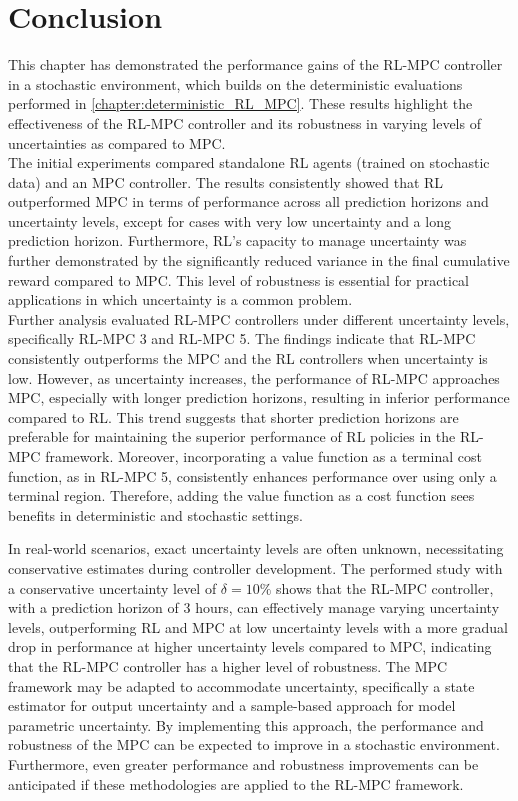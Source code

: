 \section{Conclusion}
This chapter has demonstrated the performance gains of the RL-MPC controller in a stochastic environment, which builds on the deterministic evaluations performed in \autoref{chapter:deterministic_RL_MPC}. These results highlight the effectiveness of the RL-MPC controller and its robustness in varying levels of uncertainties as compared to MPC. \\
The initial experiments compared standalone RL agents (trained on stochastic data) and an MPC controller. The results consistently showed that RL outperformed MPC in terms of performance across all prediction horizons and uncertainty levels, except for cases with very low uncertainty and a long prediction horizon. Furthermore, RL’s capacity to manage uncertainty was further demonstrated by the significantly reduced variance in the final cumulative reward compared to MPC. This level of robustness is essential for practical applications in which uncertainty is a common problem.\\
Further analysis evaluated RL-MPC controllers under different uncertainty levels, specifically RL-MPC 3 and RL-MPC 5. The findings indicate that RL-MPC consistently outperforms the MPC and the RL controllers when uncertainty is low. However, as uncertainty increases, the performance of RL-MPC approaches MPC, especially with longer prediction horizons, resulting in inferior performance compared to RL. This trend suggests that shorter prediction horizons are preferable for maintaining the superior performance of RL policies in the RL-MPC framework. Moreover, incorporating a value function as a terminal cost function, as in RL-MPC 5, consistently enhances performance over using only a terminal region. Therefore, adding the value function as a cost function sees benefits in deterministic and stochastic settings.

In real-world scenarios, exact uncertainty levels are often unknown, necessitating conservative estimates during controller development. The performed study with a conservative uncertainty level of $\delta = 10\%$ shows that the RL-MPC controller, with a prediction horizon of 3 hours, can effectively manage varying uncertainty levels, outperforming RL and MPC at low uncertainty levels with a more gradual drop in performance at higher uncertainty levels compared to MPC, indicating that the RL-MPC controller has a higher level of robustness. The MPC framework may be adapted to accommodate uncertainty, specifically a state estimator for output uncertainty and a sample-based approach for model parametric uncertainty. By implementing this approach, the performance and robustness of the MPC can be expected to improve in a stochastic environment. Furthermore, even greater performance and robustness improvements can be anticipated if these methodologies are applied to the RL-MPC framework.

